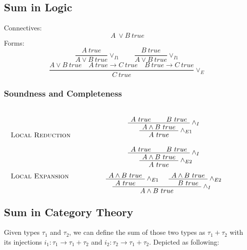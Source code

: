 \documentclass{article}
\begin{document}
\subsection*{Sum in Logic}
Connectives:
\begin{equation*}
A \ \vee B\ true
\end{equation*}
Forms:
\begin{equation*}
\frac{A\ true}
{A \vee B\ true}\vee_{I1}
\qquad
\frac{B\ true}
{A \vee B\ true}\vee_{I1}
\end{equation*}
\begin{equation*}
\frac{A \vee B\ true\quad A\ true \rightarrow C\ true \quad B\ true \rightarrow C\ true}
{C\ true}\vee_{E}
\end{equation*}

\subsubsection*{Soundness and Completeness}

\[
\begin{tabular}{@{} l >{\centering\arraybackslash}m{.7\textwidth} @{}}
\textsc{Local Reduction} &
  \begin{prooftree}
  \AxiomC{$A\ true$}
  \AxiomC{$B\ true$}
  \RightLabel{$\wedge_{I}$}
  \BinaryInfC{$A\wedge B\ true$}
  \RightLabel{$\wedge_{E1}$}
  \UnaryInfC{$A\ true$}
  \end{prooftree}
  \begin{prooftree}
  \AxiomC{$A\ true$}
  \AxiomC{$B\ true$}
  \RightLabel{$\wedge_{I}$}
  \BinaryInfC{$A\wedge B\ true$}
  \RightLabel{$\wedge_{E2}$}
  \UnaryInfC{$A\ true$}
  \end{prooftree}
\\
\textsc{Local Expansion} &
  \begin{prooftree}
  \AxiomC{$A\wedge B\ true$}
  \RightLabel{$\wedge_{E1}$}
  \UnaryInfC{$A\ true$}
  \AxiomC{$A\wedge B\ true$}
  \RightLabel{$\wedge_{E2}$}
  \UnaryInfC{$B\ true$}
  \RightLabel{$\wedge_{I}$}
  \BinaryInfC{$A\wedge B\ true$}
  \end{prooftree}
\end{tabular}
\]

\subsection*{Sum in Category Theory}
Given types $\tau_{1}$ and $\tau_{2}$, we can define the sum of those two types as $\tau_{1}+\tau_{2}$ with its injections $i_{1} : \tau_{1} \rightarrow \tau_{1}+\tau_{2}$ and $i_{2} : \tau_{2} \rightarrow \tau_{1}+\tau_{2}$. Depicted as following:
\end{document}
